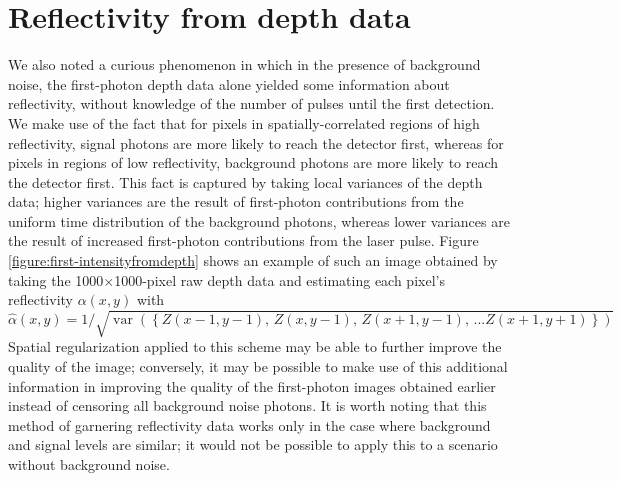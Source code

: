\section{Reflectivity from depth data}
We also noted a curious phenomenon in which in the presence of background noise, the first-photon depth data alone yielded some information about reflectivity, without knowledge of the number of pulses until the first detection. We make use of the fact that for pixels in spatially-correlated regions of high reflectivity, signal photons are more likely to reach the detector first, whereas for pixels in regions of low reflectivity, background photons are more likely to reach the detector first. This fact is captured by taking local variances of the depth data; higher variances are the result of first-photon contributions from the uniform time distribution of the background photons, whereas lower variances are the result of increased first-photon contributions from the laser pulse. Figure \ref{figure:first-intensityfromdepth} shows an example of such an image obtained by taking the 1000$\times$1000-pixel raw depth data and estimating each pixel's reflectivity $\alpha(x,y)$ with
\begin{equation}
\hat{\alpha}(x,y) = 1 / \sqrt{\operatorname{var}\left(\left\{ Z(x-1, y-1),\,Z(x, y-1),\,Z(x+1,y-1),\,...Z(x+1,y+1)\right\}\right)}
\end{equation}
Spatial regularization applied to this scheme may be able to further improve the quality of the image; conversely, it may be possible to make use of this additional information in improving the quality of the first-photon images obtained earlier instead of censoring all background noise photons. It is worth noting that this method of garnering reflectivity data works only in the case where background and signal levels are similar; it would not be possible to apply this to a scenario without background noise.

